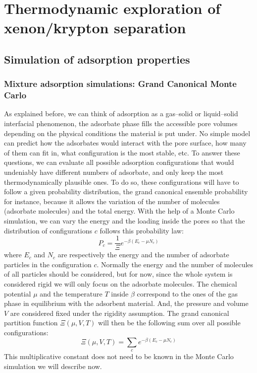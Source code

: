 \documentclass[main.tex]{subfiles}
\begin{document}
\chapter{Thermodynamic exploration of xenon/krypton separation}
\vspace*{-1\baselineskip}

\section{Simulation of adsorption properties}

\subsection{Mixture adsorption simulations: Grand Canonical Monte Carlo}

As explained before, we can think of adsorption as a gas--solid or liquid--solid interfacial phenomenon, the adsorbate phase fills the accessible pore volumes depending on the physical conditions the material is put under. No simple model can predict how the adsorbates would interact with the pore surface, how many of them can fit in, what configuration is the most stable, etc. To answer these questions, we can evaluate all possible adsorption configurations that would undeniably have different numbers of adsorbate, and only keep the most thermodynamically plausible ones. To do so, these configurations will have to follow a given probability distribution, the grand canonical ensemble probability for instance, because it allows the variation of the number of molecules (adsorbate molecules) and the total energy. With the help of a Monte Carlo simulation, we can vary the energy and the loading inside the pores so that the distribution of configurations $c$ follows this probability law: 
\begin{equation}
  P_c = \dfrac{1}{\Xi}e^{-\beta\left(E_c-\mu N_c\right)} 
  \label{eqn:gc}
\end{equation}
where $E_c$ and $N_c$ are respectively the energy and the number of adsorbate particles in the configuration $c$. Normally the energy and the number of molecules of all particles should be considered, but for now, since the whole system is considered rigid we will only focus on the adsorbate molecules. The chemical potential $\mu$ and the temperature $T$ inside $\beta$ correspond to the ones of the gas phase in equilibrium with the adsorbent material. And, the pressure and volume $V$ are considered fixed under the rigidity assumption. The grand canonical partition function $\Xi(\mu,V,T)$ will then be the following sum over all possible configurations: 
\begin{equation}
  \Xi(\mu,V,T) = \sum_c e^{-\beta\left(E_c-\mu N_c\right)} 
\end{equation}
This multiplicative constant does not need to be known in the Monte Carlo simulation we will describe now. 
\end{document}
